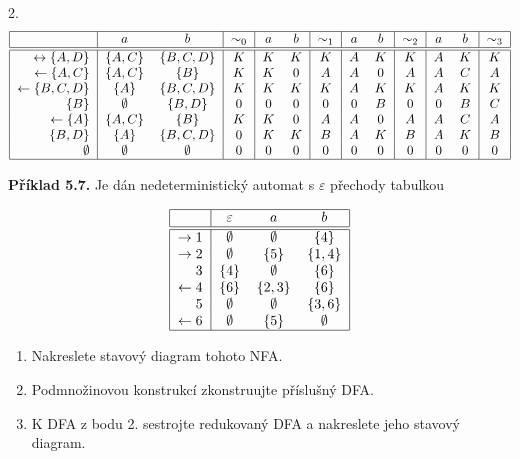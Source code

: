 \documentclass[11pt]{article}
\begin{document}
2.
\[
\begin{tabular}{|r|c c|c|c c|c|c c|c|c c|c|}
    \hline
    & $a$ & $b$ & $\sim_0$ & $a$ & $b$ & $\sim_1$ & $a$ & $b$ & $\sim_2$ & $a$ & $b$ & $\sim_3$\\
    \hline
    \hline
    $\leftrightarrow \{A,D\}$& $\{A,C\}$  & $\{B,C,D\}$ & $K$ & $K$ & $K$ & $K$ & $A$ & $K$ & $K$ & $A$ & $K$ & $K$\\
    $\leftarrow \{A,C\}$     & $\{A,C\}$  & $\{B\}$     & $K$ & $K$ & $0$ & $A$ & $A$ & $0$ & $A$ & $A$ & $C$ & $A$\\
    $\leftarrow \{B,C,D\}$   & $\{A\}$    & $\{B,C,D\}$ & $K$ & $K$ & $K$ & $K$ & $A$ & $K$ & $K$ & $A$ & $K$ & $K$\\
    $\{B\}$                  & $\emptyset$& $\{B,D\}$   & $0$ & $0$ & $0$ & $0$ & $0$ & $B$ & $0$ & $0$ & $B$ & $C$\\
    $\leftarrow \{A\}$       & $\{A,C\}$  & $\{B\}$     & $K$ & $K$ & $0$ & $A$ & $A$ & $0$ & $A$ & $A$ & $C$ & $A$\\
    $\{B,D\}$                & $\{A\}$    & $\{B,C,D\}$ & $0$ & $K$ & $K$ & $B$ & $A$ & $K$ & $B$ & $A$ & $K$ & $B$\\
    $\emptyset$              &$\emptyset$ &$\emptyset$  & $0$ & $0$ & $0$ & $0$ & $0$ & $0$ & $0$ & $0$ & $0$ & $0$\\ 
    \hline
\end{tabular}
\]


\pagebreak 
\textbf{Příklad 5.7.} Je dán nedeterministický automat s $\varepsilon$ přechody tabulkou

\[
    \begin{tabular}{|r|c c c|}
        \hline
        & $\varepsilon$ & $a$ & $b$\\
        \hline
        \hline
        $\rightarrow 1$ & $\emptyset$ & $\emptyset$ & $\{4\}$\\
        $\rightarrow 2$ & $\emptyset$ & $\{5\}$ & $\{1, 4\}$\\
        $3$ & $\{4\}$ & $\emptyset$ & $\{6\}$\\
        $\leftarrow 4$ & $\{6\}$ & $\{2, 3\}$ & $\{6\}$\\
        $5$ & $\emptyset$ & $\emptyset$ & $\{3, 6\}$\\
        $\leftarrow 6$ & $\emptyset$ & $\{5\}$ & $\emptyset$\\
        \hline
    \end{tabular}
\]

\begin{enumerate}
    \item Nakreslete stavový diagram tohoto NFA.
    \item Podmnožinovou konstrukcí zkonstruujte příslušný DFA.
    \item K DFA z bodu 2. sestrojte redukovaný DFA a nakreslete jeho stavový diagram.
\end{enumerate}
\end{document}
